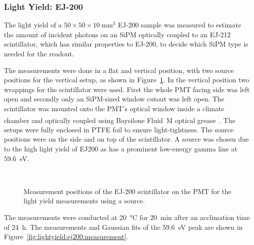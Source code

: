 \subsubsection{Light Yield: EJ-200}
The light yield of a $50 \times 50 \times 10~ \si{\milli\meter\cubed}$ EJ-200 sample was measured to estimate the amount of incident photons on an SiPM optically coupled to an EJ-212 scintillator, which has similar properties to EJ-200, to decide which SiPM type is needed for the readout.

The measurements were done in a flat and vertical position, with two source positions for the vertical setup, as shown in Figure~\ref{fig:lightyield:ej200:setup}.
In the vertical position two wrappings for the scintillator were used.
First the whole PMT facing side was left open and secondly only an \gls{SiPM}-sized window cutout was left open.
The scintillator was mounted onto the PMT's optical window inside a climate chamber and optically coupled using Baysilone\textsuperscript{{\textregistered}} Fluid~M optical grease~\cite{bayer:baysilone}.
The setups were fully enclosed in PTFE foil to ensure light-tightness.
The source positions were on the side and on top of the scintillator.
A  source was chosen due to the high light yield of EJ200 as  has a prominent low-energy gamma line at \SI{59.6}{\electronvolt}.

\begin{figure}[h]
    \centering        
    \hspace{0.02\textwidth}
    \\ 
    \caption{Measurement positions of the EJ-200 scintillator on the \gls{PMT} for the light yield measurements using a  source.}\label{fig:lightyield:ej200:setup}
\end{figure}

The measurements were conducted at \SI{20}{\celsius} for \SI{20}{\minute} after an acclimation time of \SI{24}{\hour}.
The measurements and Gaussian fits of the \SI{59.6}{\electronvolt} peak are shown in Figure~\ref{fig:lightyield:ej200:measurement}.

